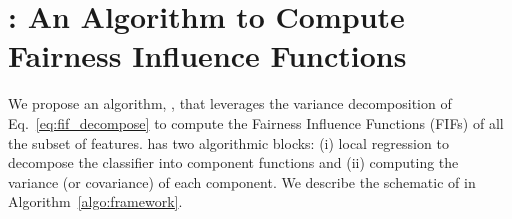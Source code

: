 \section{\fairXplainer: An Algorithm to Compute Fairness Influence Functions}\label{sec:fairxplainer}
\begin{comment}
Represent the algorithm as a sequence of two blocks: (1) Component function learning (2) Covariance computation of component functions. 
\end{comment}
We propose an algorithm, {\fairXplainer}, that leverages the variance decomposition of Eq.~\eqref{eq:fif_decompose} to compute the Fairness Influence Functions (FIFs) of all the subset of features. {\fairXplainer} has two algorithmic blocks: (i) local regression to decompose the classifier into component functions and (ii) computing the variance (or covariance) of each component. We describe the schematic of \fairXplainer{} in Algorithm~\ref{algo:framework}.
\setlength{\textfloatsep}{12pt}%

